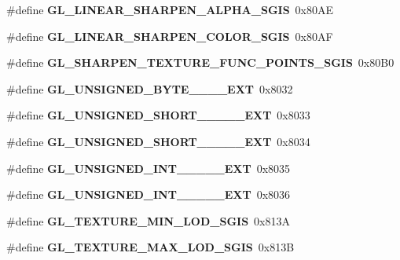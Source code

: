 \begin{DoxyCompactItemize}
\item 
\#define {\bfseries G\+L\+\_\+\+L\+I\+N\+E\+A\+R\+\_\+\+S\+H\+A\+R\+P\+E\+N\+\_\+\+A\+L\+P\+H\+A\+\_\+\+S\+G\+I\+S}~0x80\+A\+E\label{_s_d_l__opengl_8h_a30dbfbe35451a5fcc12b42bf3744ec16}

\item 
\#define {\bfseries G\+L\+\_\+\+L\+I\+N\+E\+A\+R\+\_\+\+S\+H\+A\+R\+P\+E\+N\+\_\+\+C\+O\+L\+O\+R\+\_\+\+S\+G\+I\+S}~0x80\+A\+F\label{_s_d_l__opengl_8h_aa5eece901dbd542481f21fdf265b5fab}

\item 
\#define {\bfseries G\+L\+\_\+\+S\+H\+A\+R\+P\+E\+N\+\_\+\+T\+E\+X\+T\+U\+R\+E\+\_\+\+F\+U\+N\+C\+\_\+\+P\+O\+I\+N\+T\+S\+\_\+\+S\+G\+I\+S}~0x80\+B0\label{_s_d_l__opengl_8h_a4f75ce1659760bd5587366ebaed5c0f4}

\item 
\#define {\bfseries G\+L\+\_\+\+U\+N\+S\+I\+G\+N\+E\+D\+\_\+\+B\+Y\+T\+E\+\_\+\_\+\_\+\_\+\+E\+X\+T}~0x8032\label{_s_d_l__opengl_8h_a398dcdd0ef8494d181a8636a4b32357b}

\item 
\#define {\bfseries G\+L\+\_\+\+U\+N\+S\+I\+G\+N\+E\+D\+\_\+\+S\+H\+O\+R\+T\+\_\+\_\+\_\+\_\+\_\+\+E\+X\+T}~0x8033\label{_s_d_l__opengl_8h_aea6b5bd47d55702e4822a64ec5b97b21}

\item 
\#define {\bfseries G\+L\+\_\+\+U\+N\+S\+I\+G\+N\+E\+D\+\_\+\+S\+H\+O\+R\+T\+\_\+\_\+\_\+\_\+\_\+\+E\+X\+T}~0x8034\label{_s_d_l__opengl_8h_a4989dac57f34fc13065b9bf155103ffb}

\item 
\#define {\bfseries G\+L\+\_\+\+U\+N\+S\+I\+G\+N\+E\+D\+\_\+\+I\+N\+T\+\_\+\_\+\_\+\_\+\_\+\+E\+X\+T}~0x8035\label{_s_d_l__opengl_8h_a3671bf162ae762d9266ebd5512aff9eb}

\item 
\#define {\bfseries G\+L\+\_\+\+U\+N\+S\+I\+G\+N\+E\+D\+\_\+\+I\+N\+T\+\_\+\_\+\_\+\_\+\_\+\+E\+X\+T}~0x8036\label{_s_d_l__opengl_8h_abd7431873fdc607ff3a8b5c2b6531693}

\item 
\#define {\bfseries G\+L\+\_\+\+T\+E\+X\+T\+U\+R\+E\+\_\+\+M\+I\+N\+\_\+\+L\+O\+D\+\_\+\+S\+G\+I\+S}~0x813\+A\label{_s_d_l__opengl_8h_a433c7bd706b4078c1b649ea2eae9a6af}

\item 
\#define {\bfseries G\+L\+\_\+\+T\+E\+X\+T\+U\+R\+E\+\_\+\+M\+A\+X\+\_\+\+L\+O\+D\+\_\+\+S\+G\+I\+S}~0x813\+B\label{_s_d_l__opengl_8h_a99bdfce7c5356621a33180b4a539db3b}


\end{DoxyCompactItemize}
